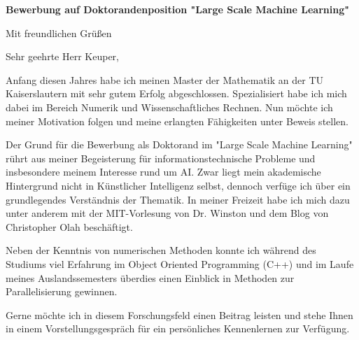 \documentclass[11pt,a4paper,sans]{moderncv}        %
\date{30. März 2018}
\begin{document}

\opening{{\bfseries Bewerbung auf Doktorandenposition "Large Scale Machine Learning"}}
\closing{Mit freundlichen Grüßen}
\makelettertitle

Sehr geehrte Herr Keuper,
\begin{justify}	
Anfang diesen Jahres habe ich meinen Master der Mathematik an der TU Kaiserslautern mit sehr gutem Erfolg abgeschlossen. Spezialisiert habe ich mich dabei im Bereich Numerik und Wissenschaftliches Rechnen. Nun möchte ich meiner Motivation folgen und meine erlangten Fähigkeiten unter Beweis stellen. 

Der Grund für die Bewerbung als Doktorand im "Large Scale Machine Learning" rührt aus meiner Begeisterung für informationstechnische Probleme und insbesondere meinem Interesse rund um AI. 
Zwar liegt mein akademische Hintergrund nicht in Künstlicher Intelligenz selbst, dennoch verfüge ich über ein grundlegendes Verständnis der Thematik. In meiner Freizeit habe ich mich dazu unter anderem mit der MIT-Vorlesung von Dr. Winston und dem Blog von Christopher Olah beschäftigt. 

Neben der Kenntnis von numerischen Methoden konnte ich während des Studiums viel Erfahrung im Object Oriented Programming (C++) und im Laufe meines Auslandssemesters überdies einen Einblick in Methoden zur Parallelisierung gewinnen.

Gerne möchte ich in diesem Forschungsfeld einen Beitrag leisten und
stehe Ihnen in einem Vorstellungsgespräch für ein persönliches Kennenlernen zur Verfügung.
\end{justify}

\makeletterclosing
\clearpage
\makecvtitle
\end{document}
